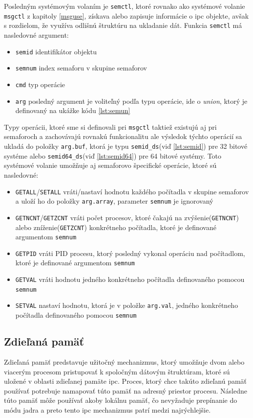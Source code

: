 Posledným systémovým volaním je \texttt{semctl}, ktoré rovnako ako systémové volanie \texttt{msgctl} z kapitoly \ref{msguse}, získava alebo zapisuje informácie o \acrshort{ipc} objekte, avšak s rozdielom, že využíva odlišnú štruktúru na ukladanie dát. Funkcia \texttt{semctl} má nasledovné argument\cite{semctl}:
\begin{itemize}
\item \texttt{semid} identifikátor objektu
\item \texttt{semnum} index semaforu v skupine semaforov
\item \texttt{cmd} typ operácie
\item \texttt{arg} posledný argument je voliteľný podľa typu operácie, ide o \textit{union}, ktorý je definovaný na ukážke kódu \ref{lst:semun}
\end{itemize}
Typy operácii, ktoré sme si definovali pri \texttt{msgctl} taktiež existujú aj pri semaforoch a zachovávajú rovnakú funkcionalitu ale výsledok týchto operácií sa ukladá do položky \texttt{arg.buf}, ktorá je typu \texttt{semid\_ds}(viď \ref{lst:semid}) pre 32 bitové systéme alebo \texttt{semid64\_ds}(viď \ref{lst:semid64}) pre 64 bitové systémy. Toto systémové volanie umožňuje aj semaforovo špecifické operácie, ktoré sú nasledovné\cite{semctl}:
\begin{itemize}
\item \texttt{GETALL}/\texttt{SETALL} vráti/nastaví hodnotu každého počítadla v skupine semaforov a uloží ho do položky \texttt{arg.array}, parameter \texttt{semnum} je ignorovaný
\item \texttt{GETNCNT}/\texttt{GETZCNT} vráti počet procesov, ktoré čakajú na zvýšenie(\texttt{GETNCNT}) alebo zníženie(\texttt{GETZCNT}) konkrétneho počítadla, ktoré je definované argumentom \texttt{semnum}
\item \texttt{GETPID} vráti PID procesu, ktorý posledný vykonal operáciu nad počítadlom, ktoré je definované argumentom \texttt{semnum}
\item \texttt{GETVAL} vráti hodnotu jedného konkrétneho počítadla definovaného pomocou \texttt{semnum}
\item \texttt{SETVAL} nastaví hodnotu, ktorá je v položke \texttt{arg.val}, jedného konkrétneho počítadla definovaného pomocou \texttt{semnum}
\end{itemize}
\subsection{Zdieľaná pamäť}
Zdieľaná pamäť predstavuje užitočný mechanizmus, ktorý umožňuje dvom alebo viacerým procesom pristupovať k spoločným dátovým štruktúram, ktoré sú uložené v oblasti zdieľanej pamäte \acrshort{ipc}.\cite{linux} Proces, ktorý chce takúto zdieľanú pamäť používať potrebuje namapovať túto pamäť na adresný priestor procesu. Následne túto pamäť môže používať akoby lokálnu pamäť, čo nevyžaduje prepínanie do módu jadra a preto tento \acrshort{ipc} mechanizmus patrí medzi najrýchlejšie.\cite{newlinux}

